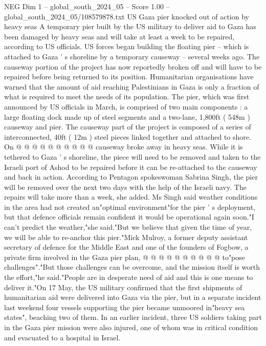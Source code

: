 \begin{textsample}{NEG Dim 1 – global\_south\_2024\_05 – Score 1.00 – global\_south\_2024\_05/108579878.txt}  \label{ex:f1_neg_212}
US Gaza pier knocked out of action by heavy seas A temporary pier built by the US military to deliver aid to Gaza has been damaged by heavy seas and will take at least a week to be repaired, according to US officials.
US forces began building the floating pier -- which is attached to Gaza ' s shoreline by a temporary causeway -- several weeks ago.
The causeway portion of the project has now reportedly broken off and will have to be repaired before being returned to its position.
Humanitarian organisations have warned that the amount of aid reaching Palestinians in Gaza is only a fraction of what is required to meet the needs of its population.
The pier, which was first announced by US officials in March, is comprised of two main components : a large floating dock made up of steel segments and a two-lane, 1,800ft ( 548m ) causeway and pier.
The causeway part of the project is composed of a series of interconnected, 40ft ( 12m ) steel pieces linked together and attached to shore.
On @ @ @ @ @ @ @ @ @ @ causeway broke away in heavy seas.
While it is tethered to Gaza ' s shoreline, the piece will need to be removed and taken to the Israeli port of Ashod to be repaired before it can be re-attached to the causeway and back in action.
According to Pentagon spokeswoman Sabrina Singh, the pier will be removed over the next two days with the help of the Israeli navy.
The repairs will take more than a week, she added.
Ms Singh said weather conditions in the area had not created an"optimal environment"for the pier ' s deployment, but that defence officials remain confident it would be operational again soon."I can't predict the weather,"she said."But we believe that given the time of year, we will be able to re-anchor this pier."Mick Mulroy, a former deputy assistant secretary of defence for the Middle East and one of the founders of Fogbow, a private firm involved in the Gaza pier plan, @ @ @ @ @ @ @ @ @ @ to"pose challenges"."But those challenges can be overcome, and the mission itself is worth the effort,"he said."People are in desperate need of aid and this is one means to deliver it."On 17 May, the US military confirmed that the first shipments of humanitarian aid were delivered into Gaza via the pier, but in a separate incident last weekend four vessels supporting the pier became unmoored in"heavy sea states", beaching two of them.
In an earlier incident, three US soldiers taking part in the Gaza pier mission were also injured, one of whom was in critical condition and evacuated to a hospital in Israel.

\end{textsample}
